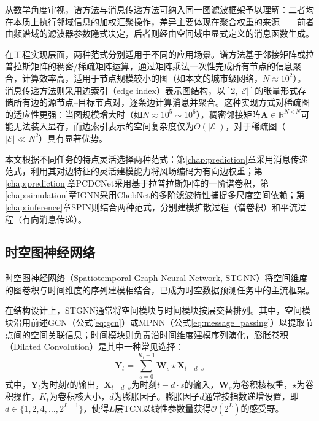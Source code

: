 从数学角度审视，谱方法与消息传递方法可纳入同一图滤波框架予以理解：二者均在本质上执行邻域信息的加权汇聚操作，差异主要体现在聚合权重的来源——前者由频谱域的滤波器参数隐式决定，后者则经由空间域中显式定义的消息函数生成。

在工程实现层面，两种范式分别适用于不同的应用场景。谱方法基于邻接矩阵或拉普拉斯矩阵的稠密/稀疏矩阵运算，通过矩阵乘法一次性完成所有节点的信息聚合，计算效率高，适用于节点规模较小的图（如本文的城市级网络，$N \approx 10^2$）。消息传递方法则采用边索引（edge index）表示图结构，以$[2, |\mathcal{E}|]$的张量形式存储所有边的源节点--目标节点对，逐条边计算消息并聚合。这种实现方式对稀疏图的适应性更强：当图规模增大时（如$N \approx 10^5 \sim 10^6$），稠密邻接矩阵$\mathbf{A} \in \mathbb{R}^{N \times N}$可能无法装入显存，而边索引表示的空间复杂度仅为$O(|\mathcal{E}|)$，对于稀疏图（$|\mathcal{E}| \ll N^2$）具有显著优势。

本文根据不同任务的特点灵活选择两种范式：第\ref{chap:prediction}章\ModelPred{}采用消息传递范式，利用其对边特征的灵活建模能力将风场编码为有向边权重；第\ref{chap:prediction}章PCDCNet采用基于拉普拉斯矩阵的一阶谱卷积，第\ref{chap:simulation}章IGNN采用ChebNet的多阶滤波特性捕捉多尺度空间依赖；第\ref{chap:inference}章SPIN则结合两种范式，分别建模扩散过程（谱卷积）和平流过程（有向消息传递）。

\subsection{时空图神经网络}
\label{subsec:stgnn}

时空图神经网络（Spatiotemporal Graph Neural Network, STGNN）将空间维度的图卷积与时间维度的序列建模相结合，已成为时空数据预测任务中的主流框架\citep{yu2018spatio,li2018diffusion}。

在结构设计上，STGNN通常将空间模块与时间模块按层交替排列。其中，空间模块沿用前述GCN（公式\eqref{eq:gcn}）或MPNN（公式\eqref{eq:message_passing}）以提取节点间的空间关联信息；时间模块则负责沿时间维度建模序列演化，膨胀卷积（Dilated Convolution）是其中一种常见选择：
\begin{equation}
\mathbf{Y}_t = \sum_{s=0}^{K_t-1} \mathbf{W}_s \star \mathbf{X}_{t-d \cdot s}
\label{eq:tcn}
\end{equation}
\noindent 式中，$\mathbf{Y}_t$为时刻$t$的输出，$\mathbf{X}_{t-d \cdot s}$为时刻$t-d \cdot s$的输入，$\mathbf{W}_s$为卷积核权重，$\star$为卷积操作，$K_t$为卷积核大小，$d$为膨胀因子。膨胀因子$d$通常按指数递增设置，即$d \in \{1, 2, 4, \ldots, 2^{L-1}\}$，使得$L$层TCN以线性参数量获得$\mathcal{O}(2^L)$的感受野。

